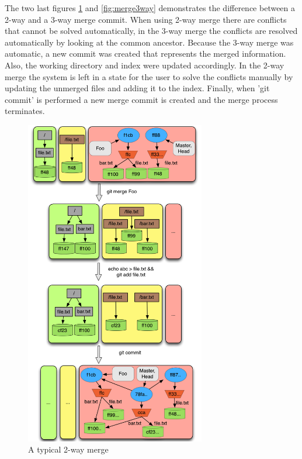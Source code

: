 The two last figures \ref{fig:merge2way} and \ref{fig:merge3way} demonstrates 
the difference between a 2-way and a 3-way merge commit. When using
2-way merge there
are conflicts that cannot be solved automatically, in the 3-way merge
the conflicts are resolved automatically by looking at
the common ancestor. Because the 3-way merge was automatic, a new commit was
created that represents the merged information. Also, the working directory and
index were updated accordingly. In the 2-way merge the system is left
in a state for the user to solve the conflicts manually by updating
the unmerged files and adding it to the index.
Finally, when 'git commit' is performed a new merge commit is created and 
the merge process terminates.\\

\begin{figure}[htp]
   \centering
   \includegraphics[width=0.7\textwidth]{images/merge2way}
   \caption{A typical 2-way merge}\label{fig:merge2way}
\end{figure}

